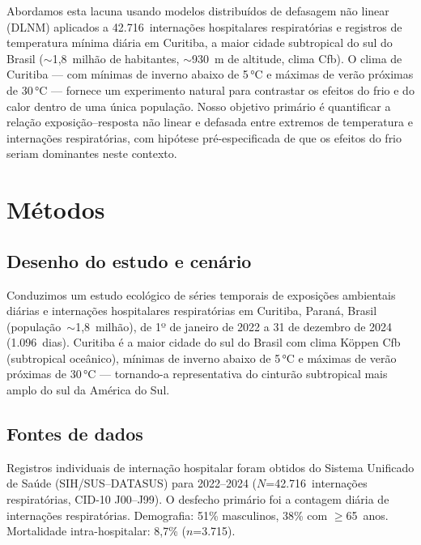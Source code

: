 \documentclass[12pt]{article}
\begin{document}
Abordamos esta lacuna usando modelos distribuídos de defasagem não
linear (DLNM) aplicados a 42.716~internações hospitalares
respiratórias e registros de temperatura mínima diária em Curitiba,
a maior cidade subtropical do sul do Brasil ($\sim$1,8~milhão de
habitantes, $\sim$930~m de altitude, clima Cfb). O clima de Curitiba
--- com mínimas de inverno abaixo de 5\,°C e máximas de verão
próximas de 30\,°C --- fornece um experimento natural para contrastar
os efeitos do frio e do calor dentro de uma única população. Nosso
objetivo primário é quantificar a relação exposição--resposta não
linear e defasada entre extremos de temperatura e internações
respiratórias, com hipótese pré-especificada de que os efeitos do
frio seriam dominantes neste contexto.


\section{Métodos}

\subsection{Desenho do estudo e cenário}

Conduzimos um estudo ecológico de séries temporais de exposições
ambientais diárias e internações hospitalares respiratórias em
Curitiba, Paraná, Brasil (população~$\sim$1,8~milhão), de 1º de
janeiro de 2022 a 31 de dezembro de 2024 (1.096~dias). Curitiba é
a maior cidade do sul do Brasil com clima Köppen Cfb (subtropical
oceânico), mínimas de inverno abaixo de 5\,°C e máximas de verão
próximas de 30\,°C --- tornando-a representativa do cinturão
subtropical mais amplo do sul da América do Sul.

\subsection{Fontes de dados}

Registros individuais de internação hospitalar foram obtidos do
Sistema Unificado de Saúde (SIH/SUS--DATASUS) para 2022--2024
($N$=42.716~internações respiratórias, CID-10 J00--J99). O desfecho
primário foi a contagem diária de internações respiratórias.
Demografia: 51\% masculinos, 38\% com $\geq$65~anos. Mortalidade
intra-hospitalar: 8,7\% ($n$=3.715).
\end{document}
